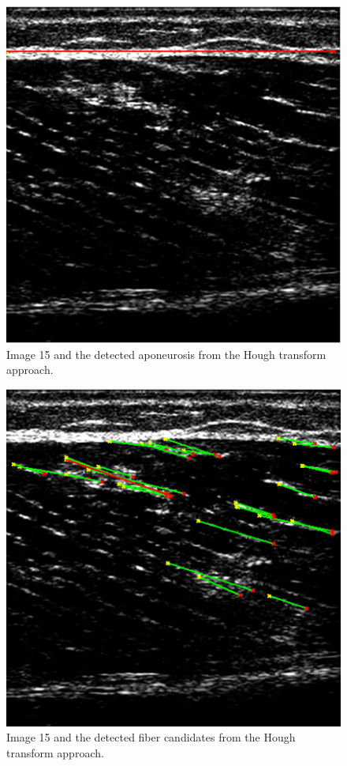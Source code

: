 \documentclass[10pt,twocolumn,letterpaper]{article}
\begin{document}
\begin{figure}
	\begin{center}		
		\includegraphics[width=1\linewidth]{img/im15_hough_apo}
	\end{center}
	\caption{Image 15 and the detected aponeurosis from the Hough transform approach.}
	\label{fig:im15_hough_apo}
	
\end{figure}

\begin{figure}
	\begin{center}		
		\includegraphics[width=1\linewidth]{img/im15_hough_fibers}
	\end{center}
	\caption{Image 15 and the detected fiber candidates from the Hough transform approach.}
	\label{fig:im15_hough_fibers}
	
\end{figure}
\end{document}

